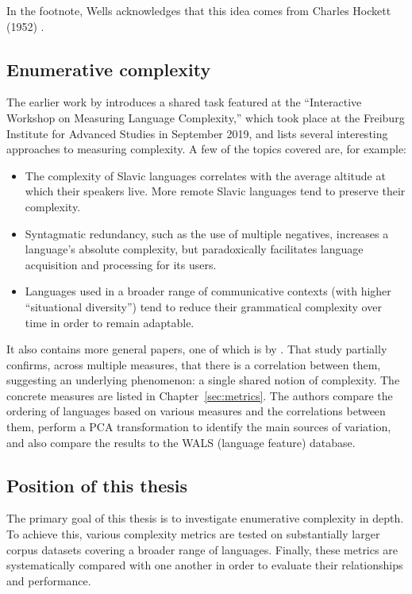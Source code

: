 In the footnote, Wells acknowledges that this idea comes from Charles Hockett (1952) \parencite{Newmeyer2022}.

\subsection{Enumerative complexity}

The earlier work by \textcite{Ehret2023} introduces a shared task featured at the ``Interactive Workshop on Measuring Language Complexity,'' which took place at the Freiburg Institute for Advanced Studies in September 2019, and lists several interesting approaches to measuring complexity. A few of the topics covered are, for example:
\begin{itemize}
    \item The complexity of Slavic languages correlates with the average altitude at which their speakers live. More remote Slavic languages tend to preserve their complexity.
    \item Syntagmatic redundancy, such as the use of multiple negatives, increases a language's absolute complexity, but paradoxically facilitates language acquisition and processing for its users.
    \item Languages used in a broader range of communicative contexts (with higher ``situational diversity'') tend to reduce their grammatical complexity over time in order to remain adaptable.
\end{itemize}

It also contains more general papers, one of which is by \textcite{Coltekin2022}. That study partially confirms, across multiple measures, that there is a correlation between them, suggesting an underlying phenomenon: a single shared notion of complexity. The concrete measures are listed in Chapter~\ref{sec:metrics}. The authors compare the ordering of languages based on various measures and the correlations between them, perform a PCA transformation to identify the main sources of variation, and also compare the results to the WALS (language feature) database.

\subsection{Position of this thesis}

The primary goal of this thesis is to investigate enumerative complexity in depth. To achieve this, various complexity metrics are tested on substantially larger corpus datasets covering a broader range of languages. Finally, these metrics are systematically compared with one another in order to evaluate their relationships and performance.
